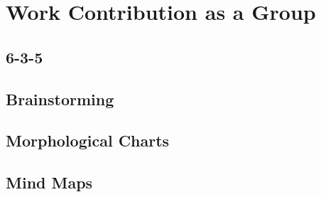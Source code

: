 \section{Work Contribution as a Group}

\subsection*{6-3-5}
\subsection*{Brainstorming}
\subsection*{Morphological Charts}
\subsection*{Mind Maps}